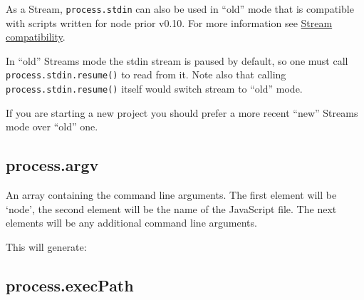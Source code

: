 As a Stream, \texttt{process.stdin} can also be used in ``old'' mode
that is compatible with scripts written for node prior v0.10. For more
information see
\href{stream.html\#stream_compatibility_with_older_node_versions}{Stream
compatibility}.

In ``old'' Streams mode the stdin stream is paused by default, so one
must call \texttt{process.stdin.resume()} to read from it. Note also
that calling \texttt{process.stdin.resume()} itself would switch stream
to ``old'' mode.

If you are starting a new project you should prefer a more recent
``new'' Streams mode over ``old'' one.

\subsection{process.argv}\label{process.argv}

An array containing the command line arguments. The first element will
be `node', the second element will be the name of the JavaScript file.
The next elements will be any additional command line arguments.

\begin{Shaded}
\begin{Highlighting}[]
\NormalTok{(}
   
\NormalTok{\});}
\end{Highlighting}
\end{Shaded}

This will generate:

\begin{Shaded}
\begin{Highlighting}[]
\NormalTok{: }
\end{Highlighting}
\end{Shaded}

\subsection{process.execPath}\label{process.execpath}

